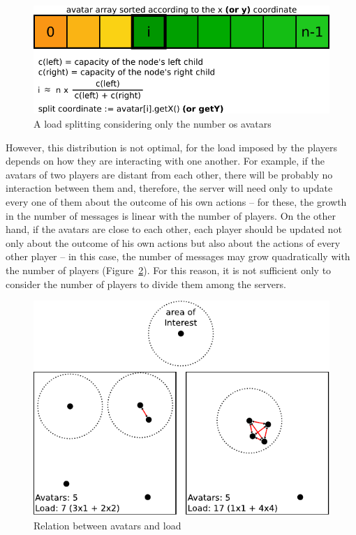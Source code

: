 \documentclass[acmjacm]{acmtrans2m}
\begin{document}
\begin{figure}
  \centering
  \includegraphics[width=0.8\linewidth]{images/vector}
  \caption{A load splitting considering only the number os avatars}
  \label{fig:vector}
\end{figure}

However, this distribution is not optimal, for the load imposed by the players depends on how they are interacting with one another. For example, if the avatars of two players are distant from each other, there will be probably no interaction between them and, therefore, the server will need only to update every one of them about the outcome of his own actions -- for these, the growth in the number of messages is linear with the number of players. On the other hand, if the avatars are close to each other, each player should be updated not only about the outcome of his own actions but also about the actions of every other player -- in this case, the number of messages may grow quadratically with the number of players \mbox{(Figure \ref{fig:load})}. For this reason, it is not sufficient only to consider the number of players to divide them among the servers.

\begin{figure}
  \centering
  \includegraphics[width=0.8\linewidth]{images/carga}
  \caption{Relation between avatars and load}
  \label{fig:load}
\end{figure}
\end{document}
